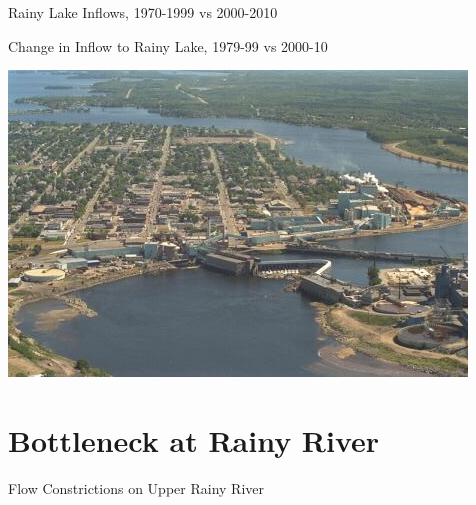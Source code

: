 \documentclass[compress,english]{beamer}
\begin{document}
{{{{%
\begin{frame}{Rainy Lake Inflows, 1970-1999 vs 2000-2010}

\begin{center}
\end{center}

\end{frame}

\begin{frame}{Change in Inflow to Rainy Lake, 1979-99 vs 2000-10}

\begin{center}
\end{center}

\end{frame}


{\usebackgroundtemplate%
	{\includegraphics[height=\paperheight]{mill.jpg}}
\section{Bottleneck at Rainy River}
}
 
\begin{frame}{Flow Constrictions on Upper Rainy River}


\end{frame}}}}}
\end{document}
